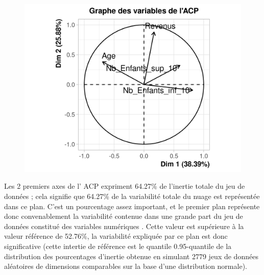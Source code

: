 \documentclass[11pt,a4paper, x11names]{article}\usepackage[]{graphicx}\usepackage[]{color}
\begin{document}
\begin{figure}[H]
\includegraphics[]{Images/graphVar.png}
\end{figure}

Les 2 premiers axes de l’ ACP  expriment 64.27\% de l’inertie totale du jeu de données ; cela signifie que 64.27\% de la variabilité totale du nuage est représentée dans ce plan. C’est un pourcentage assez important, et le premier plan représente donc convenablement la variabilité contenue dans une grande part du jeu de données constitué des variables numériques . Cette valeur est supérieure à la valeur référence de 52.76\%, la variabilité expliquée par ce plan est donc significative (cette intertie de référence est le quantile 0.95-quantile de la distribution des pourcentages d’inertie obtenue en simulant 2779 jeux de données aléatoires de dimensions comparables sur la base d’une distribution normale).
\end{document}
